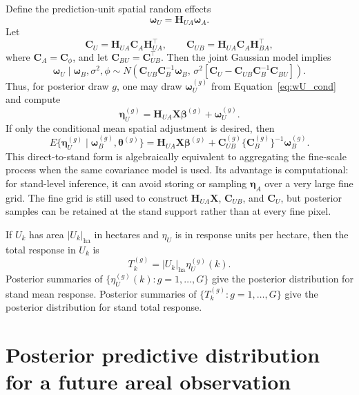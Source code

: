 \documentclass[11pt]{article}
\newcommand{\bsb}{\bm{\beta}}
\newcommand{\bsw}{\bm{\omega}}
\newcommand{\bstheta}{\bm{\theta}}
\begin{document}
Define the prediction-unit spatial random effects
\begin{equation}
\bsw_U = \bm{H}_{UA}\bsw_A.
\label{eq:wU_def}
\end{equation}
Let
\begin{equation}
\bm{C}_U
=
\bm{H}_{UA}\bm{C}_A\bm{H}_{UA}^{\top},
\qquad
\bm{C}_{UB}
=
\bm{H}_{UA}\bm{C}_A\bm{H}_{BA}^{\top},
\label{eq:CU_CUB}
\end{equation}
where $\bm{C}_A=\bm{C}_{\phi}$, and let $\bm{C}_{BU}=\bm{C}_{UB}^{\top}$. Then the joint Gaussian model implies
\begin{equation}
\bsw_U \mid \bsw_B,\sigma^2,\phi
\sim
N\left(
\bm{C}_{UB}\bm{C}_B^{-1}\bsw_B,\,
\sigma^2\left[
\bm{C}_U
-
\bm{C}_{UB}\bm{C}_B^{-1}\bm{C}_{BU}
\right]
\right).
\label{eq:wU_cond}
\end{equation}
Thus, for posterior draw $g$, one may draw $\bsw_U^{(g)}$ from Equation~\eqref{eq:wU_cond} and compute
\begin{equation}
\bm{\eta}_U^{(g)}
=
\bm{H}_{UA}\bm{X}\bsb^{(g)} + \bsw_U^{(g)}.
\label{eq:eta_U_direct_draw}
\end{equation}
If only the conditional mean spatial adjustment is desired, then
\begin{equation}
E\{\bm{\eta}_U^{(g)} \mid \bsw_B^{(g)},\bstheta^{(g)}\}
=
\bm{H}_{UA}\bm{X}\bsb^{(g)}
+
\bm{C}_{UB}^{(g)}\{\bm{C}_B^{(g)}\}^{-1}\bsw_B^{(g)}.
\label{eq:eta_U_direct_mean}
\end{equation}
This direct-to-stand form is algebraically equivalent to aggregating the fine-scale process when the same covariance model is used. Its advantage is computational: for stand-level inference, it can avoid storing or sampling $\bm{\eta}_A$ over a very large fine grid. The fine grid is still used to construct $\bm{H}_{UA}\bm{X}$, $\bm{C}_{UB}$, and $\bm{C}_U$, but posterior samples can be retained at the stand support rather than at every fine pixel.

If $U_k$ has area $|U_k|_{\mathrm{ha}}$ in hectares and $\eta_U$ is in response units per hectare, then the total response in $U_k$ is
\begin{equation}
T_k^{(g)}
=
|U_k|_{\mathrm{ha}}\eta_U^{(g)}(k).
\label{eq:total_U}
\end{equation}
Posterior summaries of $\{\eta_U^{(g)}(k):g=1,\ldots,G\}$ give the posterior distribution for stand mean response. Posterior summaries of $\{T_k^{(g)}:g=1,\ldots,G\}$ give the posterior distribution for stand total response.

\section{Posterior predictive distribution for a future areal observation}
\end{document}
